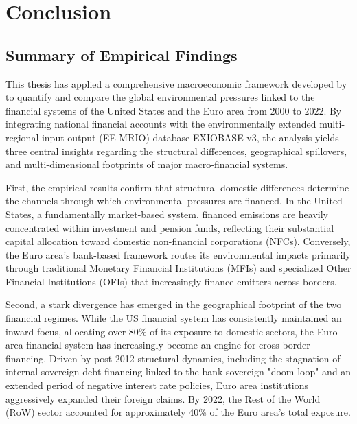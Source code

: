 
\chapter{Conclusion} %

\label{Chapter7} %

\section{Summary of Empirical Findings}

This thesis has applied a comprehensive macroeconomic framework developed by \textcite{jondeau_environmental_2026} to quantify and compare the global environmental pressures linked to the financial systems of the United States and the Euro area from 2000 to 2022. By integrating national financial accounts with the environmentally extended multi-regional input-output (EE-MRIO) database EXIOBASE v3, the analysis yields three central insights regarding the structural differences, geographical spillovers, and multi-dimensional footprints of major macro-financial systems.

First, the empirical results confirm that structural domestic differences determine the channels through which environmental pressures are financed. In the United States, a fundamentally market-based system, financed emissions are heavily concentrated within investment and pension funds, reflecting their substantial capital allocation toward domestic non-financial corporations (NFCs). Conversely, the Euro area’s bank-based framework routes its environmental impacts primarily through traditional Monetary Financial Institutions (MFIs) and specialized Other Financial Institutions (OFIs) that increasingly finance emitters across borders. 

Second, a stark divergence has emerged in the geographical footprint of the two financial regimes. While the US financial system has consistently maintained an inward focus, allocating over 80\% of its exposure to domestic sectors, the Euro area financial system has increasingly become an engine for cross-border financing. Driven by post-2012 structural dynamics, including the stagnation of internal sovereign debt financing linked to the bank-sovereign "doom loop" and an extended period of negative interest rate policies, Euro area institutions aggressively expanded their foreign claims. By 2022, the Rest of the World (RoW) sector accounted for approximately 40\% of the Euro area's total exposure. 

